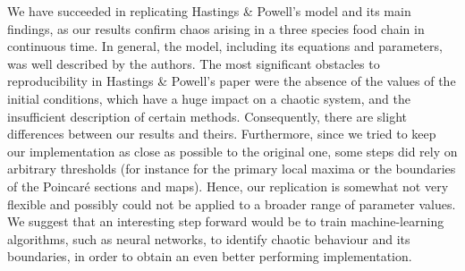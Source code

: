 We have succeeded in replicating Hastings & Powell's model and its main findings, as our
results confirm chaos arising in a three species food chain in continuous time.
In general, the model, including its equations and parameters, was well described by the
authors. The most significant obstacles to reproducibility in Hastings & Powell's paper
were the absence of the values of the initial conditions, which have a huge impact on a
chaotic system, and the insufficient description of certain methods.
Consequently, there are slight differences between our results and theirs.
Furthermore, since we tried to keep our implementation as close as possible to the
original one, some steps did rely on arbitrary thresholds (for instance for the primary
local maxima or the boundaries of the Poincaré sections and maps).
Hence, our replication is somewhat not very flexible and possibly could not be applied to
a broader range of parameter values.
We suggest that an interesting step forward would be to train machine-learning algorithms,
such as neural networks, to identify chaotic behaviour and its boundaries, in order to
obtain an even better performing implementation.
